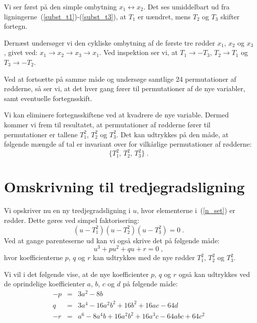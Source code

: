 \documentclass[12pt,oneside,a4paper]{article}
\newcommand{\bea}{\begin{eqnarray}}
\newcommand{\eea}{\end{eqnarray}}
\begin{document}
Vi ser først på den simple ombytning $x_1 \leftrightarrow x_2$. Det ses
umiddelbart ud fra ligningerne~(\ref{subst_t1})-(\ref{subst_t3}), at $T_1$ er
uændret, mens $T_2$ og $T_3$ skifter fortegn.

Dernæst undersøger vi den cykliske ombytning af de første tre rødder $x_1$,
$x_2$ og $x_3$, givet ved: $x_1 \rightarrow x_2 \rightarrow x_3 \rightarrow
x_1$.  Ved inspektion ser vi, at $T_1 \rightarrow -T_3$, $T_2 \rightarrow T_1$
og $T_3 \rightarrow -T_2$.

Ved at fortsætte på samme måde og undersøge samtlige 24 permutationer af
rødderne, så ser vi, at det hver gang fører til permutationer af de nye
variabler, samt eventuelle fortegnsskift.

Vi kan eliminere fortegnsskiftene ved at kvadrere de nye variable. Dermed
kommer vi frem til resultatet, at permutationer af rødderne fører til
permutationer er tallene $T_1^2$, $T_2^2$ og $T_3^2$. Det kan udtrykkes på den
måde, at følgende mængde af tal er invariant over for vilkårlige permutationer
af rødderne:
\begin{equation}
    \{T_1^2,\, T_2^2,\, T_3^2\}\;.
    \label{n_set}
\end{equation}

\section{Omskrivning til tredjegradsligning}
Vi opskriver nu en ny tredjegradsligning i $u$, hvor elementerne
i~(\ref{n_set}) er rødder. Dette gøres ved simpel faktorisering:
\begin{equation}
    (u-T_1^2)(u-T_2^2)(u-T_3^2)=0 \;.
    \label{tredje_1}
\end{equation}
Ved at gange parenteserne ud kan vi også skrive det på følgende måde:
\begin{equation}
    u^3 + pu^2+ qu + r = 0 \;,
    \label{tredje_2}
\end{equation}
hvor koefficienterne $p$, $q$ og $r$ kan udtrykkes med de nye rødder $T_1^2$, $T_2^2$ og $T_3^2$.

Vi vil i det følgende vise, at de nye koefficienter $p$, $q$ og $r$ også kan
udtrykkes ved de oprindelige koefficienter $a$, $b$, $c$ og $d$ på følgende
måde:
\bea
-p &=& 3a^2 - 8b \label{eq_p}\\
 q &=& 3a^4 - 16a^2b^2 + 16b^2 + 16ac - 64d \label{eq_q}\\
-r &=& a^6 - 8a^4b + 16a^2b^2 + 16a^3c - 64abc + 64c^2 \label{eq_r}
\eea
\end{document}
